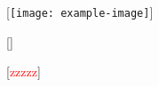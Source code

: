 \documentclass{article}
\begin{document}
[\texttt{[image: example-image]}]

\makeatletter

[]

[\textcolor{red}{zzzzz}]
\end{document}
